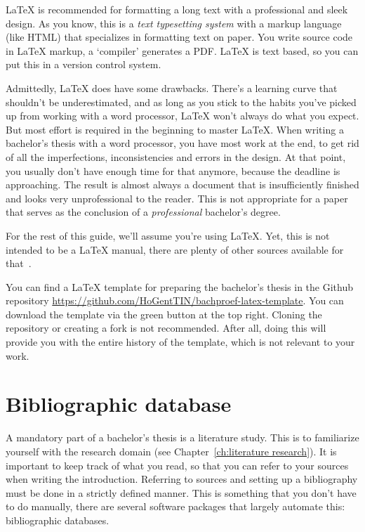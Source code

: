 {\LaTeX} is recommended for formatting a long text with a professional and sleek design. As you know, this is a \emph{text typesetting system} with a markup language (like HTML) that specializes in formatting text on paper. You write source code in {\LaTeX} markup, a `compiler' generates a PDF. {\LaTeX} is text based, so you can put this in a version control system.

Admittedly, {\LaTeX} does have some drawbacks. There's a learning curve that shouldn't be underestimated, and as long as you stick to the habits you've picked up from working with a word processor, {\LaTeX} won't always do what you expect. But most effort is required in the beginning to master {\LaTeX}. When writing a bachelor's thesis with a word processor, you have most work at the end, to get rid of all the imperfections, inconsistencies and errors in the design. At that point, you usually don't have enough time for that anymore, because the deadline is approaching. The result is almost always a document that is insufficiently finished and looks very unprofessional to the reader. This is not appropriate for a paper that serves as the conclusion of a \textit{professional} bachelor's degree.

For the rest of this guide, we'll assume you're using {\LaTeX}. Yet, this is not intended to be a {\LaTeX} manual, there are plenty of other sources available for that~\parencite{Oetiker2015}.

You can find a {\LaTeX} template for preparing the bachelor's thesis in the Github repository \url{https://github.com/HoGentTIN/bachproef-latex-template}. You can download the template via the green button at the top right. Cloning the repository or creating a fork is not recommended. After all, doing this will provide you with the entire history of the template, which is not relevant to your work.


\section{Bibliographic database}
\label{sec:bibliografic-database}

A mandatory part of a bachelor's thesis is a literature study. This is to familiarize yourself with the research domain (see Chapter~\ref{ch:literature research}). It is important to keep track of what you read, so that you can refer to your sources when writing the introduction. Referring to sources and setting up a bibliography must be done in a strictly defined manner. This is something that you don't have to do manually, there are several software packages that largely automate this: bibliographic databases.


